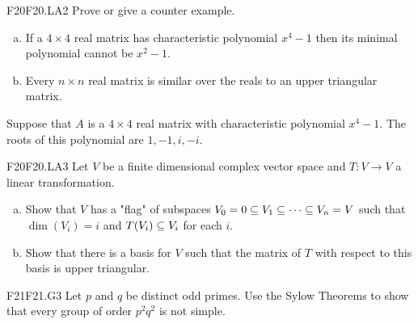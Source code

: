 \documentclass[../AlgebraQualSolutions.tex]{subfiles}
\begin{document}
\begin{prob}{F20}{F20.LA2}
Prove or give a counter example.
\begin{enumerate}[(a)]
\item If a $4 \times 4$ real matrix has characteristic polynomial $x^4 -1$ then its minimal polynomial cannot be $x^2 - 1$.
\item Every $n \times n$ real matrix is similar over the reals to an upper triangular matrix.
\end{enumerate}
\end{prob}

\begin{solution}
	Suppose that $A$ is a $4 \times 4$ real matrix with characteristic polynomial $x^4 - 1$. The roots of this polynomial are $1,-1,i, -i$.
\end{solution}

\begin{prob}{F20}{F20.LA3}
Let $V$ be a finite dimensional complex vector space and $T: V \to V$ a linear transformation.
\begin{enumerate}[(a)]
\item Show that $V$ has a "flag" of subspaces $V_0 = 0 \subseteq V_1 \subseteq \cdots \subseteq V_n = V$ such that $\dim(V_i) = i$ and $T(V_i) \subseteq V_i$ for each $i$.
\item Show that there is a basis for $V$ such that the matrix of $T$ with respect to this basis is upper triangular.
\end{enumerate}
\end{prob}



\begin{prob}{F21}{F21.G3}
Let $p$ and $q$ be distinct odd primes. Use the Sylow Theorems to show that every group of order $p^2q^2$ is not simple.
\end{prob}	
\end{document}
